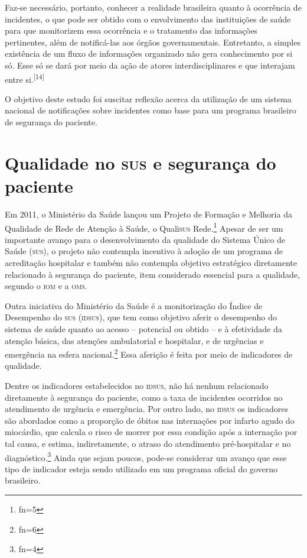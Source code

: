 \documentclass{article}
\makeatletter
\newcommand{\fn}{\afterassignment\fn@aux\count0=}
\newcommand{\fn@aux}{\csname fn\the\count0\endcsname}
\makeatother
\begin{document}
Faz-se necessário, portanto, conhecer a realidade brasileira quanto à ocorrência
de
incidentes, o que pode ser obtido com o envolvimento das instituições de saúde
para que
monitorizem essa ocorrência e o tratamento das informações pertinentes, além de
notificá-las
aos órgãos governamentais. Entretanto, a simples existência de um fluxo de
informações
organizado não gera conhecimento por si só. Esse só se dará por meio da ação de
atores
interdisciplinares e que interajam entre si.\textsuperscript{[}\textsuperscript{14}\textsuperscript{]}

O objetivo deste estudo foi suscitar reflexão acerca da utilização de um sistema
nacional
de notificações sobre incidentes como base para um programa brasileiro de
segurança do
paciente.

\section{Qualidade no \textsc{sus} e segurança do paciente}

Em 2011, o Ministério da Saúde lançou um Projeto de Formação e Melhoria da
Qualidade de
Rede de Atenção à Saúde, o Quali\textsc{sus} Rede.\footnote{\fn5}
Apesar de ser um importante avanço para o desenvolvimento da qualidade do
Sistema
Único de Saúde (\textsc{sus}), o projeto não contempla incentivo à adoção de um programa
de
acreditação hospitalar e também não contempla objetivo estratégico diretamente
relacionado à
segurança do paciente, item considerado essencial para a qualidade, segundo o
\textsc{iom} e a
\textsc{oms}.

Outra iniciativa do Ministério da Saúde é a monitorização do Índice de
Desempenho do \textsc{sus}
(\textsc{idsus}), que tem como objetivo aferir o desempenho do sistema de saúde quanto ao
acesso –
potencial ou obtido – e à efetividade da atenção básica, das atenções
ambulatorial e
hospitalar, e de urgências e emergência na esfera nacional.\footnote{\fn6}
Essa aferição é feita por meio de indicadores de qualidade.

Dentre os indicadores estabelecidos no \textsc{idsus}, não há nenhum relacionado
diretamente à
segurança do paciente, como a taxa de incidentes ocorridos no atendimento de
urgência e
emergência. Por outro lado, no \textsc{idsus} os indicadores são abordados como a
proporção de óbitos
nas internações por infarto agudo do miocárdio, que calcula o risco de morrer
por essa
condição após a internação por tal causa, e estima, indiretamente, o atraso do
atendimento
pré-hospitalar e no diagnóstico.\footnote{\fn4}
Ainda que sejam poucos, pode-se considerar um avanço que esse tipo de indicador
esteja sendo utilizado em um programa oficial do governo brasileiro.
\end{document}
